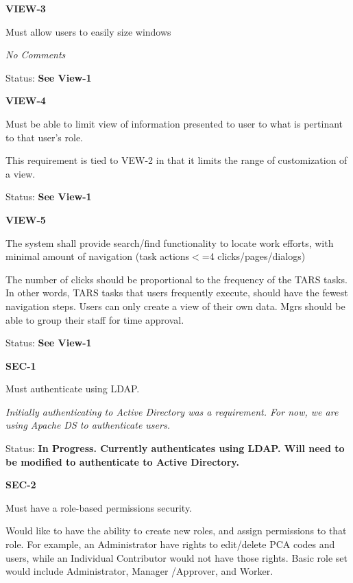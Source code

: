 \documentclass{article}
\begin{document}
\noindent \textbf{VIEW-3}

\noindent Must allow users to easily size windows

 \textit{No Comments}

\textit{ }Status: \textbf{See View-1}\textit{}

\noindent \textit{}


\noindent \textbf{VIEW-4}

\noindent Must be able to limit view of information presented to user to what is pertinant to that user's role.

This requirement is tied to VEW-2 in that it limits the range of customization of a view.

Status: \textbf{See View-1}

\noindent \textit{}


\noindent \textbf{VIEW-5}

\noindent The system shall provide search/find functionality to locate work efforts, with minimal amount of navigation (task actions$<$=4 clicks/pages/dialogs)

\noindent The number of clicks should be proportional to the frequency of the TARS tasks. In other words, TARS tasks that users frequently execute, should have the fewest navigation steps. Users can only create a view of their own data. Mgrs should be able to group their staff for time approval.

\noindent Status: \textbf{See View-1}

\noindent \textit{}


\noindent \textbf{SEC-1}

\noindent Must authenticate using LDAP.

\noindent \textit{Initially authenticating to Active Directory was a requirement. For now, we are using Apache DS to authenticate users. }

\noindent Status: \textbf{In Progress.  Currently authenticates using LDAP.  Will need to be modified to authenticate to Active Directory.}\textit{}

\noindent \textit{}


\noindent \textbf{SEC-2}

\noindent Must have a role-based permissions security.

\noindent Would like to have the ability to create new roles, and assign permissions to that role. For example, an Administrator have rights to edit/delete PCA codes and users, while an Individual Contributor would not have those rights. Basic role set would include Administrator, Manager /Approver, and Worker.
\end{document}
